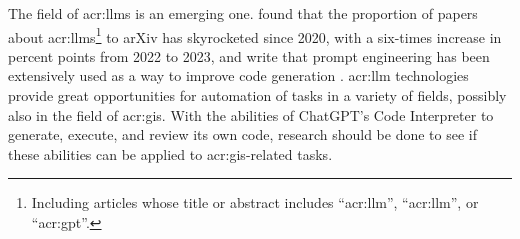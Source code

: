 The field of \glspl{acr:llm} is an emerging one. \cite[2]{fanLargeLanguageModels2023} found that the proportion of papers about \glspl{acr:llm}\footnote{Including articles whose title or abstract includes \enquote{\acrshort{acr:llm}}, \enquote{\acrlong{acr:llm}}, or \enquote{\acrshort{acr:gpt}}.} to arXiv has skyrocketed since 2020, with a six-times increase in percent points from 2022 to 2023, and write that prompt engineering has been extensively used as a way to improve code generation \citep[7]{fanLargeLanguageModels2023}. \gls{acr:llm} technologies provide great opportunities for automation of tasks in a variety of fields, possibly also in the field of \gls{acr:gis}. With the abilities of ChatGPT's Code Interpreter to generate, execute, and review its own code, research should be done to see if these abilities can be applied to \gls{acr:gis}-related tasks.

